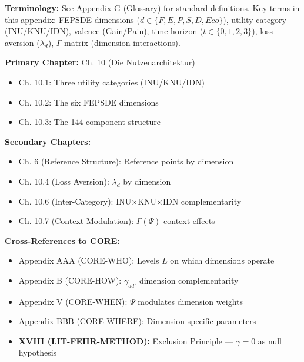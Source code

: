 
\begin{tcolorbox}[colback=gray!5!white, colframe=gray!50!black]
\textbf{Terminology:} See Appendix G (Glossary) for standard definitions.
Key terms in this appendix: FEPSDE dimensions ($d \in \{F,E,P,S,D,Eco\}$),
utility category (INU/KNU/IDN), valence (Gain/Pain), time horizon ($t \in \{0,1,2,3\}$),
loss aversion ($\lambda_d$), $\Gamma$-matrix (dimension interactions).
\end{tcolorbox}

\begin{tcolorbox}[colback=green!5!white, colframe=green!75!black,
    title=\textbf{Chapter References}]

\textbf{Primary Chapter:} Ch. 10 (Die Nutzenarchitektur)
\begin{itemize}[nosep]
    \item Ch. 10.1: Three utility categories (INU/KNU/IDN)
    \item Ch. 10.2: The six FEPSDE dimensions
    \item Ch. 10.3: The 144-component structure
\end{itemize}

\textbf{Secondary Chapters:}
\begin{itemize}[nosep]
    \item Ch. 6 (Reference Structure): Reference points by dimension
    \item Ch. 10.4 (Loss Aversion): $\lambda_d$ by dimension
    \item Ch. 10.6 (Inter-Category): INU$\times$KNU$\times$IDN complementarity
    \item Ch. 10.7 (Context Modulation): $\Gamma(\Psi)$ context effects
\end{itemize}

\textbf{Cross-References to CORE:}
\begin{itemize}[nosep]
    \item Appendix AAA (CORE-WHO): Levels $L$ on which dimensions operate
    \item Appendix B (CORE-HOW): $\gamma_{dd'}$ dimension complementarity
    \item Appendix V (CORE-WHEN): $\Psi$ modulates dimension weights
    \item Appendix BBB (CORE-WHERE): Dimension-specific parameters
    \item \textbf{XVIII (LIT-FEHR-METHOD):} Exclusion Principle --- $\gamma = 0$ as null hypothesis
\end{itemize}

\end{tcolorbox}


